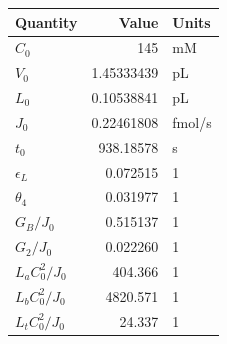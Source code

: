 \begin{tabular}{lrl}
\toprule
Quantity & Value & Units \\
\midrule
$C_0$ & 145 & mM \\
$V_0$ & 1.45333439 & pL \\
$L_0$ & 0.10538841 & pL \\
$J_0$ & 0.22461808 & fmol/s \\
$t_0$ & 938.18578 & s \\
$\epsilon_L$ & 0.072515 & 1 \\
$\theta_4$ & 0.031977 & 1 \\
$G_B/J_0$ & 0.515137 & 1 \\
$G_2/J_0$ & 0.022260 & 1 \\
$L_aC_0^2/J_0$ & 404.366 & 1 \\
$L_bC_0^2/J_0$ & 4820.571 & 1 \\
$L_tC_0^2/J_0$ & 24.337 & 1 \\
\bottomrule
\end{tabular}
